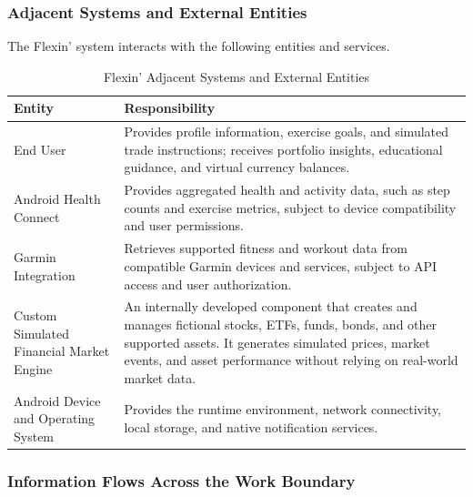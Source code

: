 \documentclass[12pt]{article}
\begin{document}
\subsubsection{Adjacent Systems and External Entities}

The Flexin' system interacts with the following entities and services.

\begin{table}[H]
    \centering
    \small
    \renewcommand{\arraystretch}{1.25}
    \begin{tabularx}{\textwidth}{
        |>{\raggedright\arraybackslash}p{3.5cm}
        |>{\raggedright\arraybackslash}X|}
        \hline
        \textbf{Entity} & \textbf{Responsibility} \\
        \hline
        End User &
        Provides profile information, exercise goals, and simulated
        trade instructions; receives portfolio insights, educational
        guidance, and virtual currency balances. \\
        \hline
        Android Health Connect &
        Provides aggregated health and activity data, such as step
        counts and exercise metrics, subject to device compatibility
        and user permissions. \\
        \hline
        Garmin Integration &
        Retrieves supported fitness and workout data from compatible
        Garmin devices and services, subject to API access and user
        authorization. \\
        \hline
        Custom Simulated Financial Market Engine &
        An internally developed component that creates and manages
        fictional stocks, ETFs, funds, bonds, and other supported
        assets. It generates simulated prices, market events, and
        asset performance without relying on real-world market data. \\
        \hline
        Android Device and Operating System &
        Provides the runtime environment, network connectivity,
        local storage, and native notification services. \\
        \hline
    \end{tabularx}
    \caption{Flexin' Adjacent Systems and External Entities}
    \label{tab:flexin-entities}
\end{table}

\subsubsection{Information Flows Across the Work Boundary}
\end{document}
